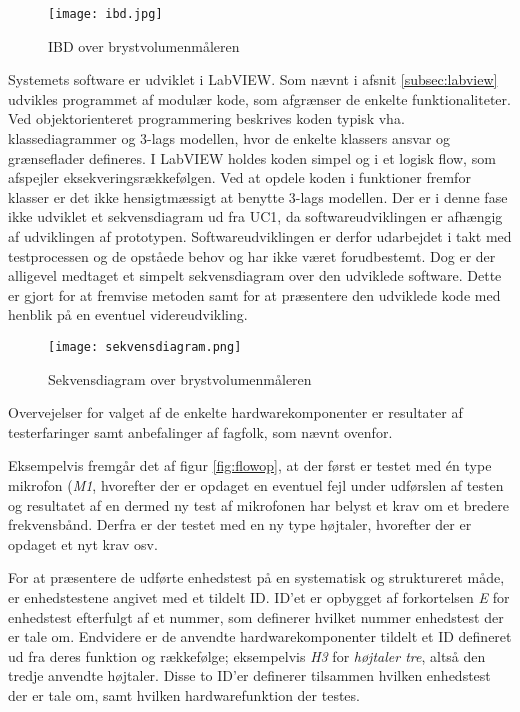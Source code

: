\begin{figure}[htb]
\centering
\texttt{[image: ibd.jpg]}
\caption{IBD over brystvolumenmåleren}
\label{fig:ibd}
\end{figure}

Systemets software er udviklet i LabVIEW. Som nævnt i afsnit \ref{subsec:labview} udvikles programmet af modulær kode, som afgrænser de enkelte funktionaliteter. Ved objektorienteret programmering beskrives koden typisk vha. klassediagrammer og 3-lags modellen, hvor de enkelte klassers ansvar og grænseflader defineres. I LabVIEW holdes koden simpel og i et logisk flow, som afspejler eksekveringsrækkefølgen. Ved at opdele koden i funktioner fremfor klasser er det ikke hensigtmæssigt at benytte 3-lags modellen. 
Der er i denne fase ikke udviklet et sekvensdiagram ud fra UC1, da softwareudviklingen er afhængig af udviklingen af prototypen. Softwareudviklingen er derfor udarbejdet i takt med testprocessen og de opståede behov og har ikke været forudbestemt. Dog er der alligevel medtaget et simpelt sekvensdiagram over den udviklede software. Dette er gjort for at fremvise metoden samt for at præsentere den udviklede kode med henblik på en eventuel videreudvikling.

\begin{figure}[htb]
\centering
\texttt{[image: sekvensdiagram.png]}
\caption{Sekvensdiagram over brystvolumenmåleren}
\label{fig:sekvens}
\end{figure}

Overvejelser for valget af de enkelte hardwarekomponenter er resultater af testerfaringer samt anbefalinger af fagfolk, som nævnt ovenfor. 

Eksempelvis fremgår det af figur \ref{fig:flowop}, at der først er testet med én type mikrofon (\textit{M1}, hvorefter der er opdaget en eventuel fejl under udførslen af testen og resultatet af en dermed ny test af mikrofonen har belyst et krav om et bredere frekvensbånd. Derfra er der testet med en ny type højtaler, hvorefter der er opdaget et nyt krav osv.  

For at præsentere de udførte enhedstest på en systematisk og struktureret måde, er enhedstestene angivet med et tildelt ID. ID'et er opbygget af forkortelsen \textit{E} for enhedstest efterfulgt af et nummer, som definerer hvilket nummer enhedstest der er tale om. Endvidere er de anvendte hardwarekomponenter tildelt et ID defineret ud fra deres funktion og rækkefølge; eksempelvis \textit{H3} for \textit{højtaler tre}, altså den tredje anvendte højtaler. Disse to ID'er definerer tilsammen hvilken enhedstest der er tale om, samt hvilken hardwarefunktion der testes. 

